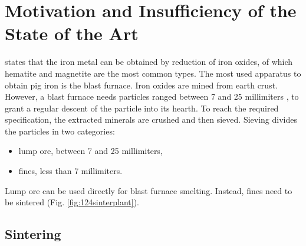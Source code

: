 
\chapter{Motivation and Insufficiency of the State of the Art}
\label{cap:insufficiency}


\citet{RefWorks:195} states that the iron metal can be obtained by reduction of
iron oxides, of which hematite and magnetite are the most common types. The most
used apparatus to obtain pig iron is the blast furnace.
Iron oxides are mined from earth crust. 
However, a blast furnace needs particles
ranged between 7 and 25 millimiters \cite{RefWorks:195}, to grant a regular
descent of the particle into its hearth.
To reach the required specification, the
extracted minerals are crushed and then sieved. 
Sieving divides the particles in two categories:
\begin{itemize}
  \item{lump ore, between 7 and 25 millimiters,}
  \item{fines, less than 7 millimiters.} 
\end{itemize}



Lump ore can be used directly for blast furnace smelting. 
Instead, fines need to be sintered (Fig. \ref{fig:124sinterplant}). \\

\section{Sintering}
\label{sec:sintering}

